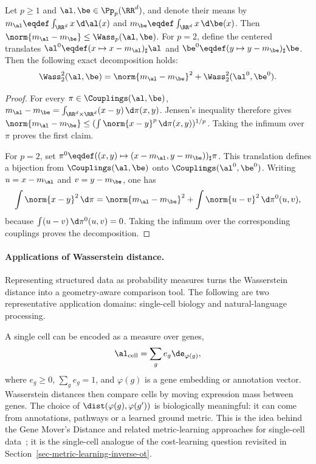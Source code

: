 \begin{prop}\label{prop-wasserstein-mean-decomposition}
	Let $p\geq1$ and $\al,\be\in\Pp_p(\RR^d)$, and denote their means by
	$m_\al\eqdef\int_{\RR^d}x\,\d\al(x)$ and
	$m_\be\eqdef\int_{\RR^d}x\,\d\be(x)$. Then
	$\norm{m_\al-m_\be}\leq\Wass_p(\al,\be)$. For $p=2$, define the centered
	translates $\al^0\eqdef(x\mapsto x-m_\al)_\sharp\al$ and
	$\be^0\eqdef(y\mapsto y-m_\be)_\sharp\be$.
	Then the following exact decomposition holds:
	\[
		\Wass_2^2(\al,\be)
		=
		\norm{m_\al-m_\be}^2+\Wass_2^2(\al^0,\be^0).
	\]
\end{prop}
\begin{proof}
	For every $\pi\in\Couplings(\al,\be)$,
	$m_\al-m_\be=\int_{\RR^d\times\RR^d}(x-y)\,\d\pi(x,y)$.
	Jensen's inequality therefore gives
	$\norm{m_\al-m_\be}\leq
	(\int\norm{x-y}^p\,\d\pi(x,y))^{1/p}$.
	Taking the infimum over $\pi$ proves the first claim.

	For $p=2$, set
	$\pi^0\eqdef((x,y)\mapsto(x-m_\al,y-m_\be))_\sharp\pi$.
	This translation defines a bijection from
	$\Couplings(\al,\be)$ onto $\Couplings(\al^0,\be^0)$. Writing
	$u=x-m_\al$ and $v=y-m_\be$, one has
	\[
		\int\norm{x-y}^2\,\d\pi
		=
		\norm{m_\al-m_\be}^2+\int\norm{u-v}^2\,\d\pi^0(u,v),
	\]
	because $\int(u-v)\,\d\pi^0(u,v)=0$. Taking the infimum over the corresponding couplings proves the decomposition.
\end{proof}

\paragraph{Applications of Wasserstein distance.}

Representing structured data as probability measures turns the Wasserstein distance into a geometry-aware comparison tool. The following are two representative application domains: single-cell biology and natural-language processing.

\begin{example}\label{ex-gene-expression-distance}
	A single cell can be encoded as a measure over genes,
	\[
		\al_{\mathrm{cell}}=\sum_g e_g\de_{\varphi(g)},
	\]
	where \(e_g\geq0\), \(\sum_g e_g=1\), and \(\varphi(g)\) is a gene embedding or annotation vector. Wasserstein distances then compare cells by moving expression mass between genes. The choice of \(\dist(\varphi(g),\varphi(g'))\) is biologically meaningful: it can come from annotations, pathways or a learned ground metric. This is the idea behind the Gene Mover's Distance and related metric-learning approaches for single-cell data~\cite{BellazziCodegoniGualandiNicoraVercesi2021GeneMover,HuizingCantiniPeyre2021WassersteinSingularVectors}; it is the single-cell analogue of the cost-learning question revisited in Section~\ref{sec-metric-learning-inverse-ot}.
\end{example}


